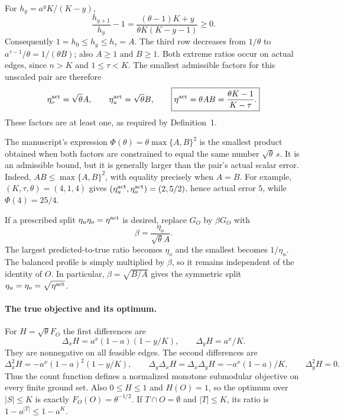 For $h_y=a^yK/(K-y)$,
\[
 \frac{h_{y+1}}{h_y}-1
 =\frac{(\theta-1)K+y}{\theta K(K-y-1)}\ge0.
\]
Consequently $1=h_0\le h_y\le h_\tau=A$. The third row decreases from
$1/\theta$ to $a^{\tau-1}/\theta=1/(\theta B)$; also $A\ge1$ and $B\ge1$.
Both extreme ratios occur on actual edges, since $n>K$ and $1\le\tau<K$.
The smallest admissible factors for this unscaled pair are therefore
\[
 \eta_o^{\rm act}=\sqrt\theta A,\qquad
 \eta_u^{\rm act}=\sqrt\theta B,
 \qquad
 \boxed{\eta^{\rm act}=\theta AB
 =\frac{\theta K-1}{K-\tau}.}
\]
These factors are at least one, as required by Definition~1.

The manuscript's expression
$\Phi(\theta)=\theta\max\{A,B\}^2$ is the smallest product obtained when
both factors are constrained to equal the same number
$\sqrt\theta\,s$. It is an admissible bound, but it is generally larger
than the pair's actual scalar error. Indeed,
$AB\le\max\{A,B\}^2$, with equality precisely when $A=B$.
For example, $(K,\tau,\theta)=(4,1,4)$ gives
$(\eta_u^{\rm act},\eta_o^{\rm act})=(2,5/2)$, hence actual error $5$, while
$\Phi(4)=25/4$.

If a prescribed split $\eta_u\eta_o=\eta^{\rm act}$ is desired, replace
$G_O$ by $\beta G_O$ with
\[
 \beta=\frac{\eta_o}{\sqrt\theta A}.
\]
The largest predicted-to-true ratio becomes $\eta_o$ and the smallest becomes
$1/\eta_u$. The balanced profile is simply multiplied by $\beta$, so it
remains independent of the identity of $O$. In particular,
$\beta=\sqrt{B/A}$ gives the symmetric split
$\eta_u=\eta_o=\sqrt{\eta^{\rm act}}$.

\paragraph{The true objective and its optimum.}
For $H=\sqrt\theta F_O$ the first differences are
\[
 \Delta_xH=a^x(1-a)(1-y/K),\qquad \Delta_yH=a^x/K.
\]
They are nonnegative on all feasible edges. The second differences are
\[
 \Delta_x^2H=-a^x(1-a)^2(1-y/K),\qquad
 \Delta_y\Delta_xH=\Delta_x\Delta_yH=-a^x(1-a)/K,
 \qquad \Delta_y^2H=0.
\]
Thus the count function defines a normalized monotone submodular objective
on every finite ground set. Also $0\le H\le1$ and $H(O)=1$, so the optimum
over $|S|\le K$ is exactly $F_O(O)=\theta^{-1/2}$. If $T\cap O=\emptyset$
and $|T|\le K$, its ratio is $1-a^{|T|}\le1-a^K$.

